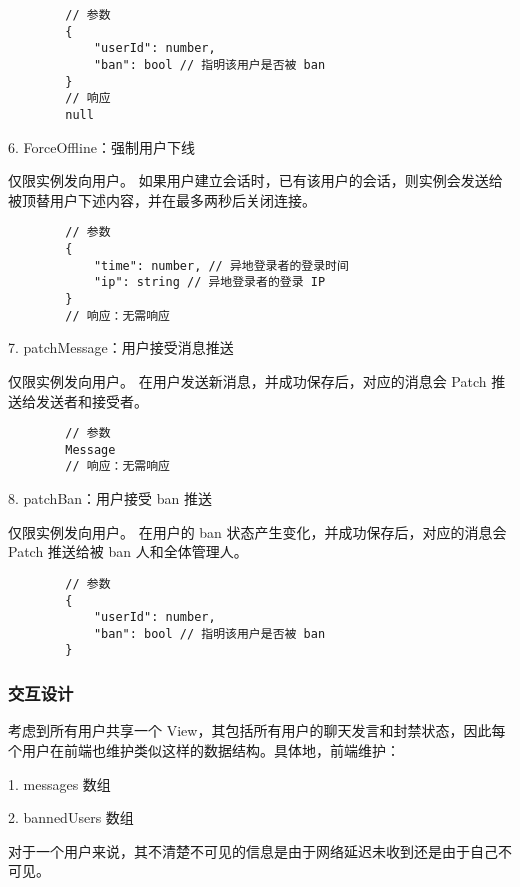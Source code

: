       {\setmainfont{Courier New Bold}
      \begin{lstlisting}
        // 参数
        {
            "userId": number,
            "ban": bool // 指明该用户是否被 ban
        }
        // 响应
        null
       \end{lstlisting}}

       6. ForceOffline：强制用户下线

       仅限实例发向用户。
       如果用户建立会话时，已有该用户的会话，则实例会发送给被顶替用户下述内容，并在最多两秒后关闭连接。
   
      {\setmainfont{Courier New Bold}
      \begin{lstlisting}
        // 参数
        {
            "time": number, // 异地登录者的登录时间
            "ip": string // 异地登录者的登录 IP
        }
        // 响应：无需响应
       \end{lstlisting}}

       7. patchMessage：用户接受消息推送

       仅限实例发向用户。
       在用户发送新消息，并成功保存后，对应的消息会 Patch 推送给发送者和接受者。
   
      {\setmainfont{Courier New Bold}
      \begin{lstlisting}
        // 参数
        Message
        // 响应：无需响应
       \end{lstlisting}}

       8. patchBan：用户接受 ban 推送

       仅限实例发向用户。
在用户的 ban 状态产生变化，并成功保存后，对应的消息会 Patch 推送给被 ban 人和全体管理人。
   
      {\setmainfont{Courier New Bold}
      \begin{lstlisting}
        // 参数
        {
            "userId": number,
            "ban": bool // 指明该用户是否被 ban
        }
       \end{lstlisting}}

  \subsubsection{交互设计}
  考虑到所有用户共享一个 View，其包括所有用户的聊天发言和封禁状态，因此每个用户在前端也维护类似这样的数据结构。具体地，前端维护：

  \quad{}1. messages 数组

  \quad{}2. bannedUsers 数组

对于一个用户来说，其不清楚不可见的信息是由于网络延迟未收到还是由于自己不可见。


